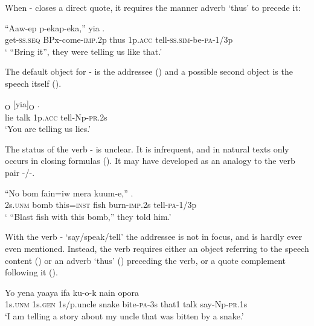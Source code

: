 When - closes a direct quote, it requires the manner adverb  `thus' to precede it:

\ea%
\label{ex:x315}
\gll ``Aaw-ep p-ekap-eka,''  yia .\\
get-\textsc{ss}.\textsc{seq} BPx-come-\textsc{imp}.2p thus 1p.\textsc{acc} tell-\textsc{ss}.\textsc{sim}-be-\textsc{pa}-1/3p\\
\glt` ``Bring it'', they were telling us like that.'
\z

The default object for - is the addressee () and a possible second object is the speech itself ().

\ea%
\label{ex:x316}
\textsubscript{O} [yia]\textsubscript{O} . \\
lie talk 1p.\textsc{acc} tell-Np-\textsc{pr}.2s \\
\glt`You are telling us lies.'
\z

The status of the verb - is unclear. It is infrequent, and in natural texts only occurs in closing formulas (). It may have developed as an analogy to the verb pair -/-.

\ea%
\label{ex:x317}
\gll ``No bom fain=iw mera kuum-e,'' . \\
2s.\textsc{unm} bomb this=\textsc{inst} fish burn-\textsc{imp}.2s tell-\textsc{pa}-1/3p \\
\glt` ``Blast fish with this bomb,'' they told him.'
\z

With the verb - `say/speak/tell' the addressee is not in focus, and is hardly ever even mentioned. Instead, the verb requires either an object referring to the speech content () or an adverb  `thus' () preceding the verb, or a quote complement following it (). 

\ea%
\label{ex:x318}
\gll Yo yena yaaya ifa ku-o-k nain opora \\
1s.\textsc{unm} 1s.\textsc{gen} 1s/p.uncle snake bite-\textsc{pa}-3s that1 talk say-Np-\textsc{pr}.1s\\
\glt`I am telling a story about my uncle that was bitten by a snake.'
\z

